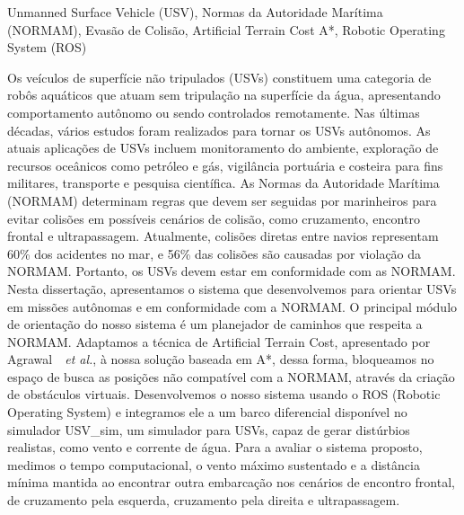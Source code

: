 \documentclass[english]{pucrs-ppgcc}
\newcommand{\etal}{{\it et al.}}
\begin{document}
\begin{resumo}{Unmanned Surface Vehicle (USV), Normas da Autoridade Marítima (NORMAM), Evasão de Colisão, Artificial Terrain Cost A*, Robotic Operating System (ROS)}

Os veículos de superfície não tripulados (USVs) constituem uma categoria de robôs aquáticos
que atuam sem tripulação na superfície da água, apresentando comportamento autônomo ou sendo controlados remotamente. 
Nas últimas décadas, vários estudos foram realizados para tornar os USVs autônomos. As atuais aplicações de USVs incluem monitoramento do ambiente, exploração de recursos oceânicos como petróleo e gás, vigilância portuária e costeira para fins militares, transporte e pesquisa científica. 
As Normas da Autoridade Marítima (NORMAM) determinam regras que devem ser seguidas por marinheiros para evitar colisões em possíveis cenários de colisão, como cruzamento, encontro frontal e ultrapassagem. 
Atualmente, colisões diretas entre navios representam 60\% dos acidentes no mar, e 56\% das colisões são causadas por violação da NORMAM. Portanto, os USVs devem estar em conformidade com as NORMAM. 
Nesta dissertação, apresentamos o sistema que desenvolvemos para orientar USVs em missões autônomas e em conformidade com a NORMAM. O principal módulo de orientação do nosso sistema é um planejador de caminhos que respeita a NORMAM. Adaptamos a técnica de Artificial Terrain Cost, apresentado por Agrawal~\cite{Agrawal2015COLREGS}~\etal, à nossa solução baseada em A*, dessa forma, bloqueamos no espaço de busca as posições não compatível com a NORMAM, através da criação de obstáculos virtuais. 
Desenvolvemos o nosso sistema usando o ROS (Robotic Operating System) e integramos ele a um barco diferencial disponível no simulador USV\_sim, um simulador para USVs, capaz de gerar distúrbios realistas, como vento e corrente de água. Para a avaliar o sistema proposto, medimos o tempo computacional, o vento máximo sustentado e a distância mínima mantida ao encontrar outra embarcação nos cenários de encontro frontal, de cruzamento pela esquerda, cruzamento pela direita e ultrapassagem.
\end{resumo}
\end{document}
